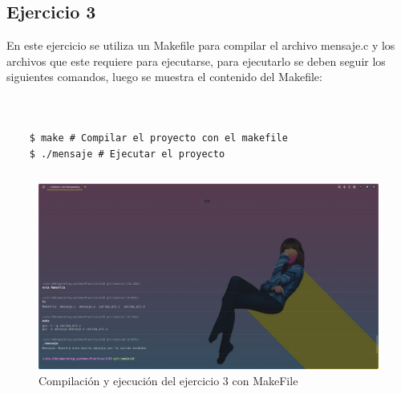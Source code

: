\documentclass[]{article}
\newenvironment{code}{\captionsetup{type=listing}}{}
\begin{document}
\subsection{Ejercicio 3}
En este ejercicio se utiliza un Makefile para compilar el archivo mensaje.c
y los archivos que este requiere para ejecutarse, para ejecutarlo se deben 
seguir los siguientes comandos, luego se muestra el contenido del Makefile:

\begin{code}
	\inputminted{c}{../E3/salida_alt.h}
\end{code}

\begin{code}
	\inputminted{c}{../E3/salida_alt.c}
\end{code}

\begin{code}
	\inputminted{c}{../E3/mensaje.c}
\end{code}

\begin{verbatim}
	$ make # Compilar el proyecto con el makefile
	$ ./mensaje # Ejecutar el proyecto
\end{verbatim}

\begin{code}
	\inputminted{Makefile}{../E3/Makefile}
\end{code}

\begin{figure}[h]
\caption{Compilación y ejecución del ejercicio 3 con MakeFile}
\centering
\includegraphics[scale=0.3,trim={0 0 20cm 19cm},clip]{e3-out.png}
\end{figure}

\newpage
\end{document}

